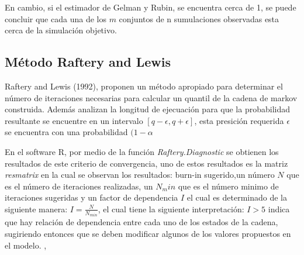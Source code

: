 En cambio, si el estimador de Gelman y Rubin, se encuentra cerca de 1, se puede concluir que cada una de los $m$ conjuntos de n sumulaciones observadas esta cerca de la simulación objetivo. 


\subsection{Método Raftery and Lewis} 

Raftery and Lewis (1992), proponen un método apropiado para determinar el número de iteraciones necesarias para calcular un quantil de la cadena de markov construida. Además analizan la longitud de ejecuación para que la probabilidad resultante se encuentre en un intervalo $[q-\epsilon,q+\epsilon]$,  esta presición requerida $\epsilon$ se encuentra con una probabilidad $(1-\alpha$  \cite{Roy}

En el software R, por medio de la función \textit{Raftery.Diagnostic} se obtienen los resultados de este criterio de convergencia, uno de estos resultados es la matriz \textit{resmatrix} en la cual se observan los resultados: burn-in sugerido,un número $N$ que es el número de iteraciones realizadas, un $N_min$ que es el número minimo de iteraciones sugeridas y un factor de dependencia $I$ el cual es determinado de la siguiente manera: $I=\frac{N}{N_{min}}$, el cual tiene la siguiente interpretación: $I>5$ indica que  hay relación de dependencia entre cada uno de los estados de la cadena, sugiriendo entonces que se deben modificar algunos de los valores propuestos en el modelo. \cite{tesisbiviana}, \cite{Rdoc}